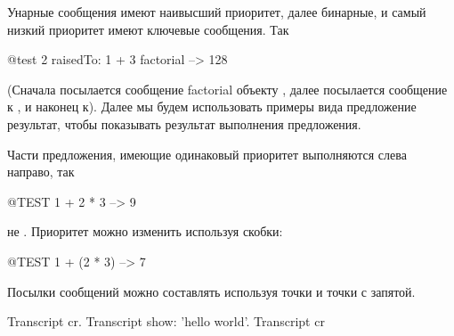 \documentclass[a4paper,10pt,twoside]{book}
\begin{document}
Унарные сообщения имеют наивысший приоритет, далее бинарные, и самый низкий приоритет имеют ключевые сообщения. Так
\begin{code}{@test}
2 raisedTo: 1 + 3 factorial --> 128
\end{code}
(Сначала посылается сообщение factorial объекту , далее посылается сообщение  к ,
и наконец  к).
Далее мы будем использовать примеры вида предложение \ct{-->} результат, чтобы показывать результат выполнения предложения.


Части предложения, имеющие одинаковый приоритет выполняются слева направо, так
\begin{code}{@TEST}
1 + 2 * 3 --> 9
\end{code}
не . Приоритет можно изменить используя скобки:
\begin{code}{@TEST}
1 + (2 * 3) --> 7
\end{code}


Посылки сообщений можно составлять используя точки и точки с запятой.

\begin{code}{}
Transcript cr.
Transcript show: 'hello world'.
Transcript cr
\end{code}

\end{document}
